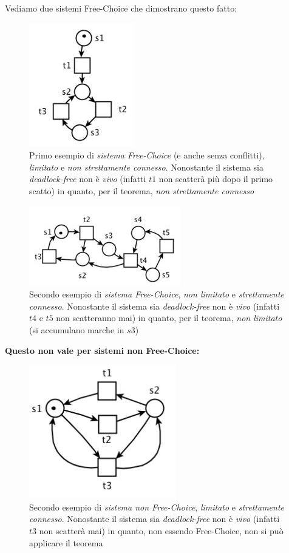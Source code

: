 \documentclass[a4paper,12pt, oneside]{book}
\begin{document}
\begin{esempio}
  Vediamo due sistemi Free-Choice che dimostrano questo fatto:\\
  \begin{figure}[H]
    \centering
    \includegraphics[scale = 0.55]{img/fc6.jpg}
    \caption{Primo esempio di \emph{sistema Free-Choice} (e anche senza
      conflitti), \emph{limitato} e \emph{non strettamente
        connesso}. Nonostante il sistema sia \emph{deadlock-free} non è
      \emph{vivo} (infatti $t1$ non scatterà più dopo il primo scatto) in
      quanto, per il teorema, \emph{non strettamente connesso}} 
  \end{figure}
  \begin{figure}[H]
    \centering
    \includegraphics[scale = 0.65]{img/fc7.jpg}
    \caption{Secondo esempio di \emph{sistema Free-Choice}, \emph{non limitato}
      e \emph{strettamente connesso}. Nonostante il sistema sia
      \emph{deadlock-free} non è \emph{vivo} (infatti $t4$ e $t5$ non
      scatteranno mai) in quanto, per il teorema, \emph{non limitato} (si
      accumulano marche in $s3$)}  
  \end{figure}
 \textbf{ Questo non vale per sistemi non Free-Choice:}
  \begin{figure}[H]
    \centering
    \includegraphics[scale = 0.5]{img/fc3.jpg}
    \caption{Secondo esempio di \emph{sistema non Free-Choice}, \emph{limitato}
      e \emph{strettamente connesso}. Nonostante il sistema sia
      \emph{deadlock-free} non è \emph{vivo} (infatti $t3$ non scatterà mai) in
      quanto, non essendo Free-Choice, non si può applicare il teorema} 
  \end{figure}
\end{esempio}
\end{document}
